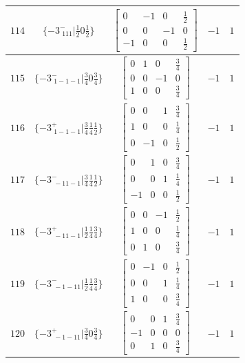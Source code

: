 \documentclass[fleqn,8pt]{jsarticle}
\begin{document}
\begin{longtable}{ccccc}
$ 114 $ & $ \{-3^{-}_{\,\,111}|\frac{1}{2} 0 \frac{1}{2}\} $ & $ \begin{bmatrix} 0 & -1 & 0 & \frac{1}{2} \\ 0 & 0 & -1 & 0 \\ -1 & 0 & 0 & \frac{1}{2} \end{bmatrix} $ & $ -1 $ & $ 1 $ \\ \hline
$ 115 $ & $ \{-3^{-}_{\,\,1-1-1}|\frac{3}{4} 0 \frac{3}{4}\} $ & $ \begin{bmatrix} 0 & 1 & 0 & \frac{3}{4} \\ 0 & 0 & -1 & 0 \\ 1 & 0 & 0 & \frac{3}{4} \end{bmatrix} $ & $ -1 $ & $ 1 $ \\ \hline
$ 116 $ & $ \{-3^{+}_{\,\,1-1-1}|\frac{3}{4} \frac{1}{4} \frac{1}{2}\} $ & $ \begin{bmatrix} 0 & 0 & 1 & \frac{3}{4} \\ 1 & 0 & 0 & \frac{1}{4} \\ 0 & -1 & 0 & \frac{1}{2} \end{bmatrix} $ & $ -1 $ & $ 1 $ \\ \hline
$ 117 $ & $ \{-3^{-}_{\,\,-11-1}|\frac{3}{4} \frac{1}{4} \frac{1}{2}\} $ & $ \begin{bmatrix} 0 & 1 & 0 & \frac{3}{4} \\ 0 & 0 & 1 & \frac{1}{4} \\ -1 & 0 & 0 & \frac{1}{2} \end{bmatrix} $ & $ -1 $ & $ 1 $ \\ \hline
$ 118 $ & $ \{-3^{+}_{\,\,-11-1}|\frac{1}{2} \frac{1}{4} \frac{3}{4}\} $ & $ \begin{bmatrix} 0 & 0 & -1 & \frac{1}{2} \\ 1 & 0 & 0 & \frac{1}{4} \\ 0 & 1 & 0 & \frac{3}{4} \end{bmatrix} $ & $ -1 $ & $ 1 $ \\ \hline
$ 119 $ & $ \{-3^{-}_{\,\,-1-11}|\frac{1}{2} \frac{1}{4} \frac{3}{4}\} $ & $ \begin{bmatrix} 0 & -1 & 0 & \frac{1}{2} \\ 0 & 0 & 1 & \frac{1}{4} \\ 1 & 0 & 0 & \frac{3}{4} \end{bmatrix} $ & $ -1 $ & $ 1 $ \\ \hline
$ 120 $ & $ \{-3^{+}_{\,\,-1-11}|\frac{3}{4} 0 \frac{3}{4}\} $ & $ \begin{bmatrix} 0 & 0 & 1 & \frac{3}{4} \\ -1 & 0 & 0 & 0 \\ 0 & 1 & 0 & \frac{3}{4} \end{bmatrix} $ & $ -1 $ & $ 1 $ \\ \hline

\end{longtable}
\end{document}
